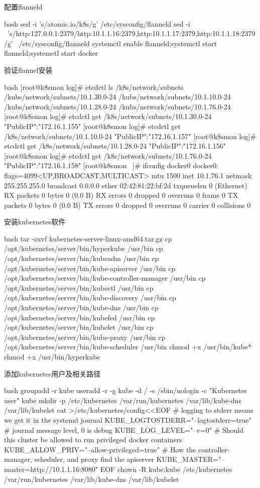 \begin{outline}[enumerate]
  \1 配置flanneld
\begin{code-block}{bash}
sed -i 's/atomic.io/k8s/g' /etc/sysconfig/flanneld
sed -i \
    's/http:\/\/127.0.0.1:2379/http:\/\/10.1.1.16:2379,http:\/\/10.1.1.17:2379,http:\/\/10.1.1.18:2379/g' \
    /etc/sysconfig/flanneld
systemctl enable flanneld;systemctl start flanneld;systemctl start docker
\end{code-block}

  \1 验证flannel安装
\begin{code-block}{bash}
[root@k8smon log]# etcdctl ls /k8s/network/subnets
/kubs/network/subnets/10.1.30.0-24
/kubs/network/subnets/10.1.10.0-24
/kubs/network/subnets/10.1.28.0-24
/kubs/network/subnets/10.1.76.0-24
[root@k8smon log]# etcdctl get /k8s/network/subnets/10.1.30.0-24
{"PublicIP":"172.16.1.155"}
[root@k8smon log]# etcdctl get /k8s/network/subnets/10.1.10.0-24
{"PublicIP":"172.16.1.157"}
[root@k8smon log]# etcdctl get /k8s/network/subnets/10.1.28.0-24
{"PublicIP":"172.16.1.156"}
[root@k8smon log]# etcdctl get /k8s/network/subnets/10.1.76.0-24
{"PublicIP":"172.16.1.158"}
[root@k8smon ~]# ifconfig docker0
docker0: flags=4099<UP,BROADCAST,MULTICAST>  mtu 1500
        inet 10.1.76.1  netmask 255.255.255.0  broadcast 0.0.0.0
        ether 02:42:81:22:bf:2d  txqueuelen 0  (Ethernet)
        RX packets 0  bytes 0 (0.0 B)
        RX errors 0  dropped 0  overruns 0  frame 0
        TX packets 0  bytes 0 (0.0 B)
        TX errors 0  dropped 0 overruns 0  carrier 0  collisions 0
\end{code-block}

  \1 安装kubernetes软件
\begin{code-block}{bash}
tar -zxvf kubernetes-server-linux-amd64.tar.gz
cp /opt/kubernetes/server/bin/hyperkube /usr/bin
cp /opt/kubernetes/server/bin/kubeadm /usr/bin
cp /opt/kubernetes/server/bin/kube-apiserver /usr/bin
cp /opt/kubernetes/server/bin/kube-controller-manager /usr/bin
cp /opt/kubernetes/server/bin/kubectl /usr/bin
cp /opt/kubernetes/server/bin/kube-discovery /usr/bin
cp /opt/kubernetes/server/bin/kube-dns /usr/bin
cp /opt/kubernetes/server/bin/kubefed /usr/bin
cp /opt/kubernetes/server/bin/kubelet /usr/bin
cp /opt/kubernetes/server/bin/kube-proxy /usr/bin
cp /opt/kubernetes/server/bin/kube-scheduler /usr/bin
chmod +x /usr/bin/kube*
chmod +x /usr/bin/hyperkube
\end{code-block}

  \1 添加kubernetes用户及相关路径
\begin{code-block}{bash}
groupadd -r kube
useradd -r -g kube -d / -s /sbin/nologin -c "Kubernetes user" kube
mkdir -p /etc/kubernetes /var/run/kubernetes /var/lib/kube-dns /var/lib/kubelet
cat >/etc/kubernetes/config<<EOF
# logging to stderr means we get it in the systemd journal
KUBE_LOGTOSTDERR="--logtostderr=true"
# journal message level, 0 is debug
KUBE_LOG_LEVEL="--v=0"
# Should this cluster be allowed to run privileged docker containers
KUBE_ALLOW_PRIV="--allow-privileged=true"
# How the controller-manager, scheduler, and proxy find the apiserver
KUBE_MASTER="--master=http://10.1.1.16:8080"
EOF
chown -R kube:kube /etc/kubernetes /var/run/kubernetes /var/lib/kube-dns /var/lib/kubelet
\end{code-block}


\end{outline}
